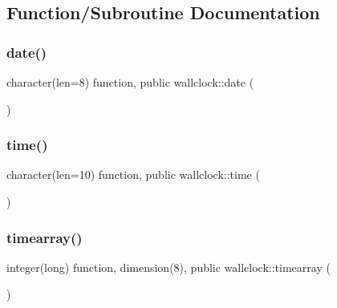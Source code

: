 \subsection{Function/\+Subroutine Documentation}
\mbox{\label{namespacewallclock_aac2bc47e557d4981f481295bd687dd50}} 
\subsubsection{\texorpdfstring{date()}{date()}}
{\footnotesize\ttfamily character(len=8) function, public wallclock\+::date (\begin{DoxyParamCaption}{ }\end{DoxyParamCaption})}

\mbox{\label{namespacewallclock_a3efb3d12447df7568e0b22b3cd4ed60d}} 
\subsubsection{\texorpdfstring{time()}{time()}}
{\footnotesize\ttfamily character(len=10) function, public wallclock\+::time (\begin{DoxyParamCaption}{ }\end{DoxyParamCaption})}

\mbox{\label{namespacewallclock_ac691a026a7b92c6cd971e86d0449d42b}} 
\subsubsection{\texorpdfstring{timearray()}{timearray()}}
{\footnotesize\ttfamily integer(long) function, dimension(8), public wallclock\+::timearray (\begin{DoxyParamCaption}{ }\end{DoxyParamCaption})}

